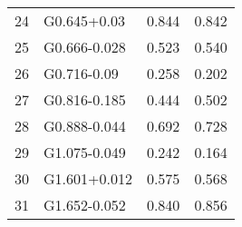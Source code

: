 \begin{tabular}{rlrr}
             24 &      G0.645+0.03 &       0.844 &      0.842 \\
             25 &     G0.666-0.028 &       0.523 &      0.540 \\
             26 &      G0.716-0.09 &       0.258 &      0.202 \\
             27 &     G0.816-0.185 &       0.444 &      0.502 \\
             28 &     G0.888-0.044 &       0.692 &      0.728 \\
             29 &     G1.075-0.049 &       0.242 &      0.164 \\
             30 &     G1.601+0.012 &       0.575 &      0.568 \\
             31 &     G1.652-0.052 &       0.840 &      0.856 \\
\bottomrule
\end{tabular}
